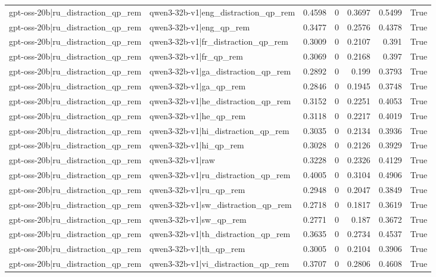 \begin{table}
\begin{tabular}{l l r r r r l}
gpt-oss-20b|ru_distraction_qp_rem & qwen3-32b-v1|eng_distraction_qp_rem & 0.4598 & 0 & 0.3697 & 0.5499 & True \\
gpt-oss-20b|ru_distraction_qp_rem & qwen3-32b-v1|eng_qp_rem & 0.3477 & 0 & 0.2576 & 0.4378 & True \\
gpt-oss-20b|ru_distraction_qp_rem & qwen3-32b-v1|fr_distraction_qp_rem & 0.3009 & 0 & 0.2107 & 0.391 & True \\
gpt-oss-20b|ru_distraction_qp_rem & qwen3-32b-v1|fr_qp_rem & 0.3069 & 0 & 0.2168 & 0.397 & True \\
gpt-oss-20b|ru_distraction_qp_rem & qwen3-32b-v1|ga_distraction_qp_rem & 0.2892 & 0 & 0.199 & 0.3793 & True \\
gpt-oss-20b|ru_distraction_qp_rem & qwen3-32b-v1|ga_qp_rem & 0.2846 & 0 & 0.1945 & 0.3748 & True \\
gpt-oss-20b|ru_distraction_qp_rem & qwen3-32b-v1|he_distraction_qp_rem & 0.3152 & 0 & 0.2251 & 0.4053 & True \\
gpt-oss-20b|ru_distraction_qp_rem & qwen3-32b-v1|he_qp_rem & 0.3118 & 0 & 0.2217 & 0.4019 & True \\
gpt-oss-20b|ru_distraction_qp_rem & qwen3-32b-v1|hi_distraction_qp_rem & 0.3035 & 0 & 0.2134 & 0.3936 & True \\
gpt-oss-20b|ru_distraction_qp_rem & qwen3-32b-v1|hi_qp_rem & 0.3028 & 0 & 0.2126 & 0.3929 & True \\
gpt-oss-20b|ru_distraction_qp_rem & qwen3-32b-v1|raw & 0.3228 & 0 & 0.2326 & 0.4129 & True \\
gpt-oss-20b|ru_distraction_qp_rem & qwen3-32b-v1|ru_distraction_qp_rem & 0.4005 & 0 & 0.3104 & 0.4906 & True \\
gpt-oss-20b|ru_distraction_qp_rem & qwen3-32b-v1|ru_qp_rem & 0.2948 & 0 & 0.2047 & 0.3849 & True \\
gpt-oss-20b|ru_distraction_qp_rem & qwen3-32b-v1|sw_distraction_qp_rem & 0.2718 & 0 & 0.1817 & 0.3619 & True \\
gpt-oss-20b|ru_distraction_qp_rem & qwen3-32b-v1|sw_qp_rem & 0.2771 & 0 & 0.187 & 0.3672 & True \\
gpt-oss-20b|ru_distraction_qp_rem & qwen3-32b-v1|th_distraction_qp_rem & 0.3635 & 0 & 0.2734 & 0.4537 & True \\
gpt-oss-20b|ru_distraction_qp_rem & qwen3-32b-v1|th_qp_rem & 0.3005 & 0 & 0.2104 & 0.3906 & True \\
gpt-oss-20b|ru_distraction_qp_rem & qwen3-32b-v1|vi_distraction_qp_rem & 0.3707 & 0 & 0.2806 & 0.4608 & True \\

\end{tabular}
\end{table}
